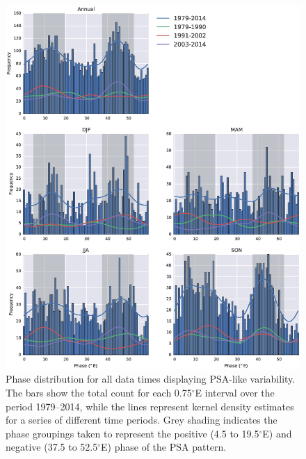 \begin{figure}
\begin{center}
\includegraphics[width=0.98\columnwidth]{figures/psa/Figure4-5.eps}
\caption[Phase distribution for all data times displaying PSA-like variability]{\label{fig:phase_distribution}
Phase distribution for all data times displaying PSA-like variability. The bars show the total count for each 0.75$^{\circ}$E interval over the period 1979--2014, while the lines represent kernel density estimates for a series of different time periods. Grey shading indicates the phase groupings taken to represent the positive (4.5 to 19.5$^{\circ}$E) and negative (37.5 to 52.5$^{\circ}$E) phase of the PSA pattern.%
}
\end{center}
\end{figure}

